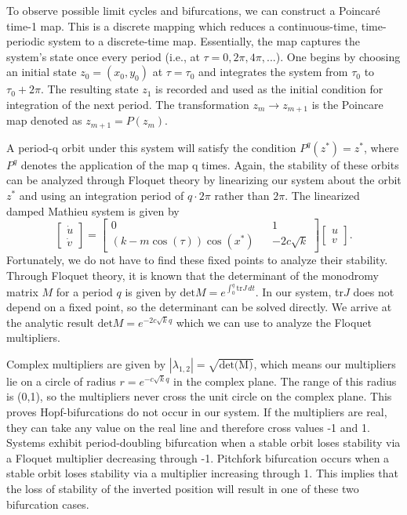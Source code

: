 \documentclass[12pt, letterpaper]{article}
\begin{document}
To observe possible limit cycles and bifurcations, we can construct a Poincaré time-1 map. This is a discrete mapping which reduces a continuous-time, time-periodic system to a discrete-time map. Essentially, the map captures the system's state once every period (i.e., at $\tau=0,2\pi,4\pi,...$). One begins by choosing an initial state $z_0=(x_0,y_0)$ at $\tau=\tau_0$ and integrates the system from $\tau_0$ to $\tau_0+2\pi$. The resulting state $z_1$ is recorded and used as the initial condition for integration of the next period. The transformation $z_m\rightarrow z_{m+1}$ is the Poincare map denoted as $z_{m+1}=P(z_m)$.

A period-q orbit under this system will satisfy the condition $P^q(z^*)=z^*$, where $P^q$ denotes the application of the map q times. Again, the stability of these orbits can be analyzed through Floquet theory by linearizing our system about the orbit $z^*$ and using an integration period of $q \cdot 2\pi$ rather than $2\pi$. The linearized damped Mathieu system is given by 
\begin{equation}
    \left[
    \begin{matrix}
        \dot{u} \\ \dot{v}
    \end{matrix}
    \right] = 
    \left[
    \begin{matrix}
        0 && 1\\(k-m\cos(\tau))\cos(x^*) && -2c\sqrt{k}
    \end{matrix}
    \right]
    \left[
    \begin{matrix}
        u \\v
    \end{matrix}
    \right].
\end{equation}
Fortunately, we do not have to find these fixed points to analyze their stability. Through Floquet theory, it is known that the determinant of the monodromy matrix $M$ for a period $q$ is given by $\text{det}M = e^{\int_0^q \text{tr}J\, dt}$. In our system, tr$J$ does not depend on a fixed point, so the determinant can be solved directly. We arrive at the analytic result $\text{det}M = e^{-2c\sqrt{k}q}$ which we can use to analyze the Floquet multipliers. 

Complex multipliers are given by $|\lambda_{1,2}| = \sqrt{\text{det(M)}}$, which means our multipliers lie on a circle of radius $r=e^{-c\sqrt{k}q}$ in the complex plane. The range of this radius is (0,1), so the multipliers never cross the unit circle on the complex plane. This proves Hopf-bifurcations do not occur in our system. If the multipliers are real, they can take any value on the real line and therefore cross values -1 and 1. Systems exhibit period-doubling bifurcation when a stable orbit loses stability via a Floquet multiplier decreasing through -1. Pitchfork bifurcation occurs when a stable orbit loses stability via a multiplier increasing through 1. This implies that the loss of stability of the inverted position will result in one of these two bifurcation cases. 
\end{document}
